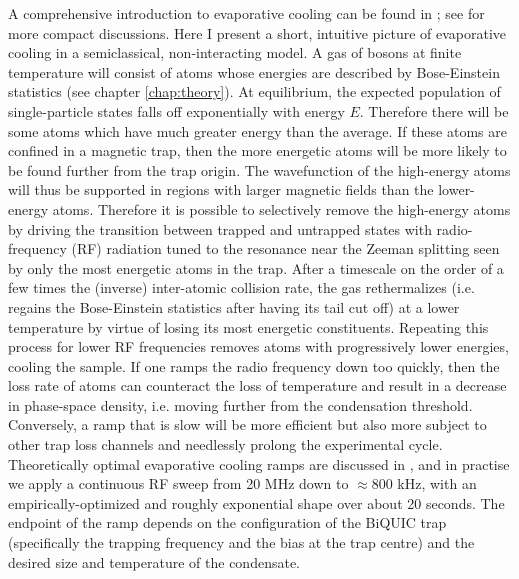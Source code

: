 	A comprehensive introduction to evaporative cooling can be found in \cite{Ketterle96}; see \cite{FootAtomic,PethickSmith} for more compact discussions. 
	Here I present a short, intuitive picture of evaporative cooling in a semiclassical, non-interacting model. 
	A gas of bosons at finite temperature will consist of atoms whose energies are described by Bose-Einstein statistics (see chapter \ref{chap:theory}). 
	At equilibrium, the expected population of single-particle states falls off exponentially with energy $E$. 
	Therefore there will be some atoms which have much greater energy than the average. 
	If these atoms are confined in a magnetic trap, then the more energetic atoms will be more likely to be found further from the trap origin.
	The wavefunction of the high-energy atoms will thus be supported in regions with larger magnetic fields than the lower-energy atoms.
	Therefore it is possible to selectively remove the high-energy atoms by driving the transition between trapped and untrapped states with radio-frequency (RF) radiation tuned to the resonance near the Zeeman splitting seen by only the most energetic atoms in the trap.
	After a timescale on the order of a few times the (inverse) inter-atomic collision rate, the gas rethermalizes (i.e. regains the Bose-Einstein statistics after having its tail cut off) at a lower temperature by virtue of losing its most energetic constituents.
	Repeating this process for lower RF frequencies removes atoms with progressively lower energies, cooling the sample.
	If one ramps the radio frequency down too quickly, then the loss rate of atoms can counteract the loss of temperature and result in a decrease in phase-space density, i.e. moving further from the condensation threshold.
	Conversely, a ramp that is slow will be more efficient but also more subject to other trap loss channels and needlessly prolong the experimental cycle.
	Theoretically optimal evaporative cooling ramps are discussed in \cite{Ketterle96}, and in practise we apply a continuous RF sweep from 20 MHz down to $\approx800$ kHz, with an empirically-optimized and roughly exponential shape over about 20 seconds.
	The endpoint of the ramp depends on the configuration of the BiQUIC trap (specifically the trapping frequency and the bias at the trap centre) and the desired size and temperature of the condensate. 
	


